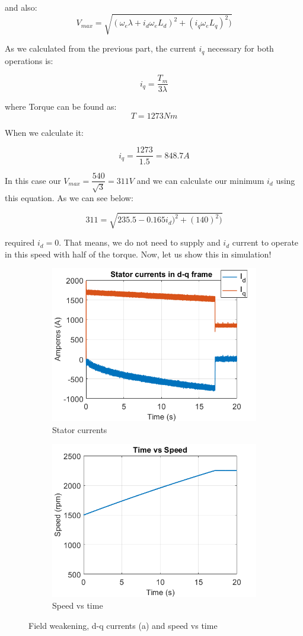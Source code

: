 and also:
\begin{equation}
 V_{max} = \sqrt{(\omega_e \lambda + i_d \omega_e L_d)^2 + (i_q \omega_e L_q)^2)}
\end{equation}

As we calculated from the previous part, the current $i_q$ necessary for both operations is:

\begin{equation}
     i_q = \dfrac{T_{m}}{3 \lambda }
\end{equation}

where Torque can be found as:
$$ T = 1273 Nm$$

When we calculate it:

$$ i_q = \dfrac{1273}{1.5} = 848.7A$$

In this case our $V_{max} = \dfrac{540}{\sqrt{3}} = 311V$ and we can calculate our minimum $i_d$ using this equation. As we can see below:

$$ 311 = \sqrt{235.5 - 0.165i_d)^2 + (140)^2) } $$

required $i_d = 0$. That means, we do not need to supply and $i_d$ current to operate in this speed with half of the torque. Now, let us show this in simulation!

\begin{figure}[H]
        \centering
        \begin{subfigure}[b]{0.475\textwidth}
            \centering
            \includegraphics[width = 8 cm]{figs/c4_new_dq.png}
            \caption{Stator currents}
            \label{fig:c4_new_dq}
        \end{subfigure}
        \hfill
        \begin{subfigure}[b]{0.475\textwidth}  
            \centering 
            \includegraphics[width = 8 cm]{figs/c4_new_speed.png}
            \caption{Speed vs time}
            \label{fig:c4_new_speed}
        \end{subfigure}
        \caption{Field weakening, d-q currents (a) and speed vs time}
        \label{fig:c4}
        \end{figure}  


